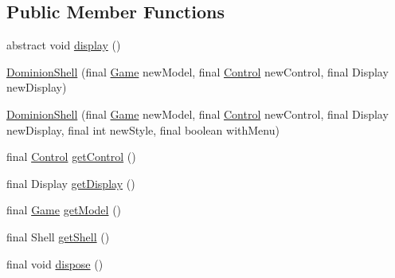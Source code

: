 \subsection*{\-Public \-Member \-Functions}
\begin{DoxyCompactItemize}
\item 
abstract void \hyperlink{classdominion_1_1view_1_1DominionShell_a313a39d0940bd369b578252f564f7025}{display} ()
\item 
\hyperlink{classdominion_1_1view_1_1DominionShell_a4d59b922a570c42eafe4fe6fceed6c04}{\-Dominion\-Shell} (final \hyperlink{interfacedominion_1_1model_1_1Game}{\-Game} new\-Model, final \hyperlink{interfacedominion_1_1control_1_1Control}{\-Control} new\-Control, final \-Display new\-Display)
\item 
\hyperlink{classdominion_1_1view_1_1DominionShell_a727ba6958438e2393e97fcf842e3ddfb}{\-Dominion\-Shell} (final \hyperlink{interfacedominion_1_1model_1_1Game}{\-Game} new\-Model, final \hyperlink{interfacedominion_1_1control_1_1Control}{\-Control} new\-Control, final \-Display new\-Display, final int new\-Style, final boolean with\-Menu)
\item 
final \hyperlink{interfacedominion_1_1control_1_1Control}{\-Control} \hyperlink{classdominion_1_1view_1_1DominionShell_afdb87fc9881d893f9a743f829eb8c2b8}{get\-Control} ()
\item 
final \-Display \hyperlink{classdominion_1_1view_1_1DominionShell_a9c3025d5c82a1706cd805bec1cda7fc1}{get\-Display} ()
\item 
final \hyperlink{interfacedominion_1_1model_1_1Game}{\-Game} \hyperlink{classdominion_1_1view_1_1DominionShell_a41cd7d605ef152e0f9d0de114f1b31c9}{get\-Model} ()
\item 
final \-Shell \hyperlink{classdominion_1_1view_1_1DominionShell_ae960a39c75a4b8010a42c579603d9283}{get\-Shell} ()
\item 
final void \hyperlink{classdominion_1_1view_1_1DominionShell_aae21d484ec5e7cb9dd55f3b7e8b831df}{dispose} ()
\end{DoxyCompactItemize}
